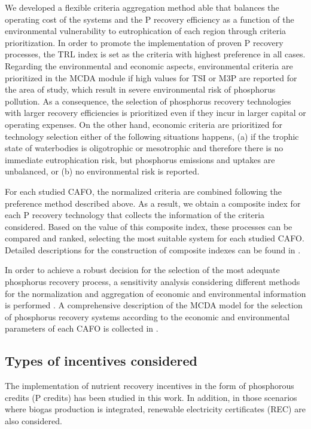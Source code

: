 \begin{refsection}[referencesCh5]
We developed a flexible criteria aggregation method able that balances the operating cost of the systems and the P recovery efficiency as a function of the environmental vulnerability to eutrophication of each region through criteria prioritization. In order to promote the implementation of proven P recovery processes, the TRL index is set as the criteria with highest preference in all cases. Regarding the environmental and economic aspects, environmental criteria are prioritized in the MCDA module if high values for TSI or M3P are reported for the area of study, which result in severe environmental risk of phosphorus pollution. As a consequence, the selection of phosphorus recovery technologies with larger recovery efficiencies is prioritized even if they incur in larger capital or operating expenses. On the other hand, economic criteria are prioritized for technology selection either of the following situations happens, (a) if the trophic state of waterbodies is oligotrophic or mesotrophic and therefore there is no immediate eutrophication risk, but phosphorus emissions and uptakes are unbalanced, or (b) no environmental risk is reported.

For each studied CAFO, the normalized criteria are combined following the preference method described above. As a result, we obtain a composite index for each P recovery technology that collects the information of the criteria considered. 
Based on the value of this composite index, these processes can be compared and ranked, selecting the most suitable system for each studied CAFO. Detailed descriptions for the construction of composite indexes can be found in  \citet{HandbookCompositeIndicators}. 

In order to achieve a robust decision for the selection of the most adequate phosphorus recovery process, a sensitivity analysis considering different methods for the normalization and aggregation of economic and environmental information is performed \citep{MarcoCinelli2020}. A comprehensive description of the MCDA model for the selection of phosphorus recovery systems according to the economic and environmental parameters of each CAFO is collected in \citet{Tool}.

\subsection{Types of incentives considered}
The implementation of nutrient recovery incentives in the form of phosphorous credits (P credits) has been studied in this work. In addition, in those scenarios where biogas production is integrated, renewable electricity certificates (REC) are also considered.


\end{refsection}
